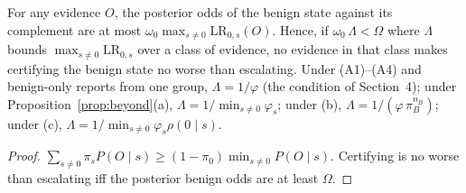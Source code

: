 \begin{corollary}\label{cor:excl}
For any evidence $O$, the posterior odds of the benign state against its complement are at most
$\omega_0\max_{s\neq0}\mathrm{LR}_{0,s}(O)$. Hence, if $\omega_0\,\Lambda<\Omega$ where $\Lambda$ bounds
$\max_{s\ne0}\mathrm{LR}_{0,s}$ over a class of evidence, no evidence in that class makes certifying the benign state
no worse than escalating. Under (A1)--(A4) and benign-only reports from one group, $\Lambda=1/\varphi$ (the condition of
Section~4); under Proposition~\ref{prop:beyond}(a), $\Lambda=1/\min_{s\neq0}\varphi_s$; under (b), $\Lambda=1/(\varphi\,\pi_B^{n_B})$;
under (c), $\Lambda=1/\min_{s\ne0}\varphi_s\rho(0\mid s)$.
\end{corollary}
\begin{proof}
$\sum_{s\neq0}\pi_sP(O\mid s)\ge(1-\pi_0)\min_{s\neq0}P(O\mid s)$. Certifying is no worse than escalating iff the
posterior benign odds are at least $\Omega$.
\end{proof}

